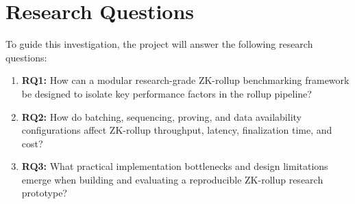 \section{Research Questions}
\label{sec:research_questions}

To guide this investigation, the project will answer the following research questions:

\begin{enumerate}
    \item \textbf{RQ1:} How can a modular research-grade ZK-rollup benchmarking framework be designed to isolate key performance factors in the rollup pipeline?
    \item \textbf{RQ2:} How do batching, sequencing, proving, and data availability configurations affect ZK-rollup throughput, latency, finalization time, and cost?
    \item \textbf{RQ3:} What practical implementation bottlenecks and design limitations emerge when building and evaluating a reproducible ZK-rollup research prototype?
\end{enumerate}
